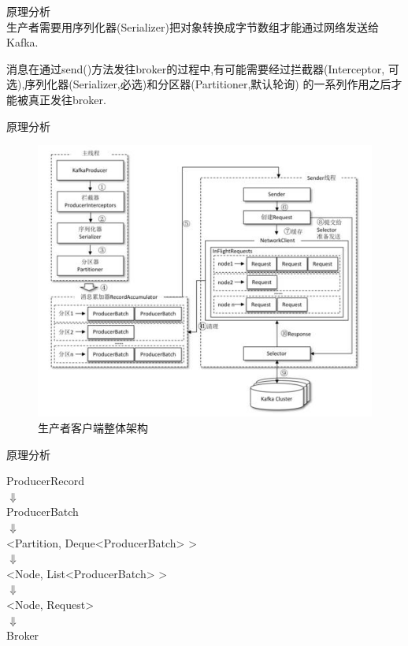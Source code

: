 \begin{frame}[plain,t]{原理分析} %
	 \\  \vspace{2ex}
	生产者需要用序列化器(Serializer)把对象转换成字节数组才能通过网络发送给Kafka.
	\vspace{2ex}
	
	消息在通过send()方法发往broker的过程中,有可能需要经过拦截器(Interceptor,{\color{red} 可选}),序列化器(Serializer,{\color{cyan}必选})和分区器(Partitioner,{\color{brown}默认轮询})
	的一系列作用之后才能被真正发往broker.
	
\end{frame}
\begin{frame}[plain,t]{原理分析} %
	 \\  \vspace{2ex}
	\begin{figure}
		\centering
		\includegraphics[width=0.7\linewidth]{image/0201}
		\caption{生产者客户端整体架构}
		\label{fig:0201}
	\end{figure}
	
\end{frame}
\begin{frame}[plain,t]{原理分析} %
	 \\  \vspace{2ex}
		
		\begin{center}
			ProducerRecord \\
			$\Downarrow$ \\
			ProducerBatch \\
			$\Downarrow$ \\
			 <Partition, Deque<ProducerBatch> > \\
			 $\Downarrow$ \\
			 <Node, List<ProducerBatch> > \\
			 $\Downarrow$ \\
			 <Node, Request> \\
			 $\Downarrow$ \\
			 Broker
		\end{center}
	
\end{frame}

